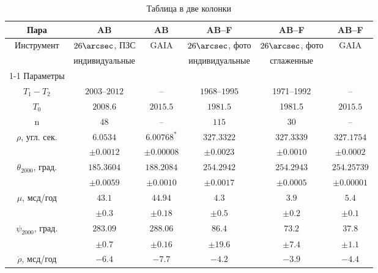 \documentclass[
 aps, pra,
 amsmath,amssymb,
 11pt,
 final,
tightenlines,
 twoside,
 twocolumn,
 nofloats,
nofootinbib,
 superscriptaddress,
showkeys,
showkeywords,
 ]
{revtex4-2}
\begin{document}
\begin{table}
\caption {Таблица в две колонки} \label{pvd}
\medskip
\begin{tabular}{c|c|c|c|c|c}
\hline
Пара                           & AB             & AB                    & AB--F             & AB--F              & AB--F \\
\hline
\multirow{2}{*}{Инструмент}    & $26\arcsec$, ПЗС    & \multirow{2}{*}{GAIA} & $26\arcsec$, фото & $26\arcsec$, фото  & \multirow{2}{*}{GAIA} \\
                               & индивидуальные &                       & индивидуальные    & сглаженные         &    \\
\cline{1-1}
Параметры                      &                &                       &                   &                    &    \\
\hline
$T_1-T_2$                        & $2003$--$2012$ & --           & $1968$--$1995$ & 1971--1992  & -- \\
$T_0$                            & $2008.6$       & $2015.5$     & $1981.5$       & 1981.5      & $2015.5$ \\
  n                              & $48$           & --           & $115$          & 30          & -- \\
 \hline
$\rho$, угл. сек.                & $6.0534$       & $6.00768^*$  & $327.3322$     & $327.3339$  & $327.1754$ \\
                                 & $\pm0.0012$    & $\pm0.00008$ & $\pm0.0023$    & $\pm0.0010$ & $\pm0.0002$ \\
\hline
$\theta_{2000}$, град.           & $185.3604$     & $188.2084$   & $254.2942$     & $254.2943$  & $254.25739$ \\
                                 & $\pm0.0059$    & $\pm0.0010$  & $\pm0.0017$    & $\pm0.0005$ & $\pm0.00001$ \\
\hline
$\mu$, мсд/год                   & $43.1$         & $44.94$      & $4.3$          & $3.9$       & $5.4$ \\
                                 & $\pm0.3$       & $\pm0.18$    & $\pm0.5$       & $\pm0.2$    & $\pm0.1$ \\
\hline
$\psi_{2000}$, град.             & $283.09$       & $288.06$     & $86.4$         & $73.2$      & $37.8$ \\
                                 & $\pm0.7$       & $\pm0.16$    & $\pm19.6$      & $\pm7.4$    & $\pm1.1$ \\
\hline
$\dot{\rho}$, мсд/год            & $-6.4$         & $-7.7$       & $-4.2$         & $-3.9$      & $-4.4$ \\

\end{tabular}
\end{table}
\end{document}
